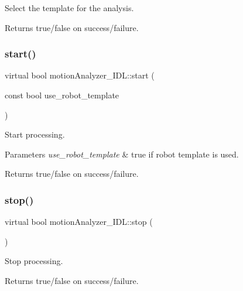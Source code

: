 Select the template for the analysis. 

\begin{DoxyReturn}{Returns}
true/false on success/failure. 
\end{DoxyReturn}
\mbox{\label{classmotionAnalyzer__IDL_aeebeafd8986b78e720eb1c6eba09207e}} 
\subsubsection{\texorpdfstring{start()}{start()}}
{\footnotesize\ttfamily virtual bool motion\+Analyzer\+\_\+\+I\+D\+L\+::start (\begin{DoxyParamCaption}\item[{const bool}]{use\+\_\+robot\+\_\+template }\end{DoxyParamCaption})\hspace{0.3cm}{\ttfamily [virtual]}}



Start processing. 


\begin{DoxyParams}{Parameters}
{\em use\+\_\+robot\+\_\+template} & true if robot template is used. \\
\hline
\end{DoxyParams}
\begin{DoxyReturn}{Returns}
true/false on success/failure. 
\end{DoxyReturn}
\mbox{\label{classmotionAnalyzer__IDL_affddad47070a4fdb10357c10037f39f5}} 
\subsubsection{\texorpdfstring{stop()}{stop()}}
{\footnotesize\ttfamily virtual bool motion\+Analyzer\+\_\+\+I\+D\+L\+::stop (\begin{DoxyParamCaption}{ }\end{DoxyParamCaption})\hspace{0.3cm}{\ttfamily [virtual]}}



Stop processing. 

\begin{DoxyReturn}{Returns}
true/false on success/failure. 
\end{DoxyReturn}
\mbox{\label{classmotionAnalyzer__IDL_a6753e9b8772e76ed6fbb4d39616f1423}} 
